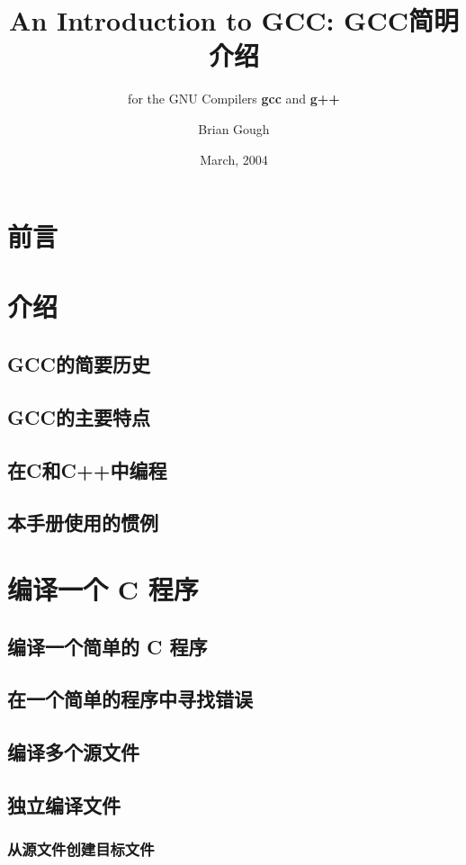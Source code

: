 \documentclass[lang=cn,10pt,newtx,scheme=chinese]{elegantbook}
\title{An Introduction to GCC: GCC简明介绍}
\subtitle{for the GNU Compilers \textbf{gcc} and \textbf{g++}}
\author{Brian Gough}
\date{March, 2004}
\begin{document}
\maketitle
\frontmatter

\tableofcontents
\mainmatter

\chapter*{前言}

\chapter{介绍}
\section{GCC的简要历史}
\section{GCC的主要特点}
\section{在C和C++中编程}
\section{本手册使用的惯例}

\chapter{编译一个 C 程序}
\section{编译一个简单的 C 程序}
\section{在一个简单的程序中寻找错误}
\section{编译多个源文件}
\section{独立编译文件}
\subsection{从源文件创建目标文件}
\end{document}

